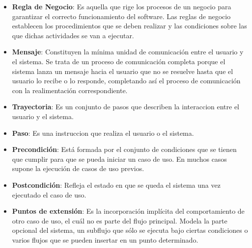 \begin{itemize}
\item \textbf{Regla de Negocio}: Es aquella que rige los procesos de un negocio para garantizar el correcto funcionamiento del software. Las reglas de negocio establecen los procedimientos que se deben realizar y las condiciones sobre las que dichas actividades se van a ejecutar.

\item \textbf{Mensaje}: Constituyen la mínima unidad de comunicación entre el usuario y el sistema. Se trata de un proceso de comunicación completa porque el sistema lanza un mensaje hacia el usuario que no se resuelve hasta que el usuario lo recibe o lo responde, completando así el proceso de comunicación con la realimentación correspondiente.

\item \textbf{Trayectoria}: Es un conjunto de pasos que describen la interaccion entre el usuario y el sistema.

\item \textbf{Paso}: Es una instruccion que realiza el usuario o el sistema.

\item \textbf{Precondición}: Está formada por el conjunto de condiciones que se tienen que cumplir para que se pueda iniciar un caso de uso. En muchos casos supone la ejecución de casos de uso previos.

\item \textbf{Postcondición}: Refleja el estado en que se queda el sistema una vez ejecutado el caso de uso.

\item \textbf{Puntos de extensión}: Es la incorporación implícita del comportamiento de otro caso de uso, el cuál no es parte del flujo principal. Modela la parte opcional del sistema, un subflujo que sólo se ejecuta bajo ciertas condiciones o varios flujos que se pueden insertar en un punto determinado. 
\end{itemize}